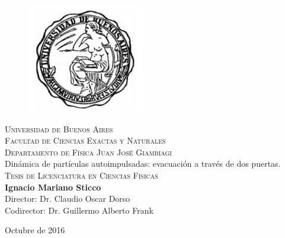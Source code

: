 \thispagestyle{empty}

\begin{center}

 \begin{figure}[htb]
\centering
\includegraphics[width=0.45\textwidth]{caratula/logo.png}
\end{figure} 



\textsc{\LARGE Universidad de Buenos Aires}\\[0.5cm]
\textsc{\large Facultad de Ciencias Exactas y Naturales}\\[0.5cm]

\textsc{  Departamento de Física Juan José Giambiagi}\\[0.5cm]


\huge Dinámica de partículas autoimpulsadas: evacuación a través de dos puertas.\\

\textsc{\large Tesis de Licenciatura en Ciencias Físicas}\\[1cm]

{\LARGE \textbf{
Ignacio Mariano Sticco}} \\ [1cm]

\large
Director: Dr. Claudio Oscar Dorso \\[0.5cm]
Codirector: Dr. Guillermo Alberto Frank
\vfill


 Octubre de 2016

\end{center}

\newpage


